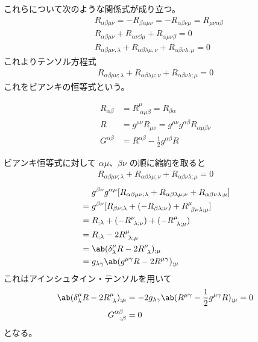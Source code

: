 \documentclass[uplatex,dvipdfmx,a4paper,11pt]{jlreq}
\theoremstyle{definition}
\begin{document}
これらについて次のような関係式が成り立つ。
\begin{align}
   & R_{\alpha\beta\mu\nu} = -R_{\beta\alpha\mu\nu} = -R_{\alpha\beta\nu\mu} = R_{\mu\nu\alpha\beta}   \\
   & R_{\alpha\beta\mu\nu} + R_{\alpha\nu\beta\mu} + R_{\alpha\mu\nu\beta} = 0                         \\
   & R_{\alpha\beta\mu\nu,\lambda} + R_{\alpha\beta\lambda\mu,\nu} + R_{\alpha\beta\nu\lambda,\mu} = 0
\end{align}
これよりテンソル方程式
\begin{align}
  R_{\alpha\beta\mu\nu;\lambda} + R_{\alpha\beta\lambda\mu;\nu} + R_{\alpha\beta\nu\lambda;\mu} = 0
\end{align}
これをビアンキの恒等式という。
\begin{definition}
  \begin{align}
    R_{\alpha\beta} & = R^\mu_{\ \alpha\mu\beta} = R_{\beta\alpha}                            \\
    R               & = g^{\mu\nu}R_{\mu\nu} = g^{\mu\nu}g^{\alpha\beta}R_{\alpha\mu\beta\nu} \\
    G^{\alpha\beta} & = R^{\alpha\beta} - \frac{1}{2}g^{\alpha\beta}R
  \end{align}
\end{definition}
ビアンキ恒等式に対して $\alpha\mu$、$\beta\nu$ の順に縮約を取ると
\begin{align}
  R_{\alpha\beta\mu\nu;\lambda} + R_{\alpha\beta\lambda\mu;\nu} + R_{\alpha\beta\nu\lambda;\mu} = 0
\end{align}
\begin{align}
   & \quad\ g^{\beta\nu}g^{\alpha\mu}[R_{\alpha\beta\mu\nu;\lambda} + R_{\alpha\beta\lambda\mu;\nu} + R_{\alpha\beta\nu\lambda;\mu}] \\
   & = g^{\beta\nu}[R_{\beta\nu;\lambda} + (- R_{\beta\lambda;\nu}) + R^\mu_{\ \beta\nu\lambda;\mu}]                                 \\
   & = R_{;\lambda} + (- R^\nu_{\ \lambda;\nu}) + (-R^\mu_{\ \lambda;\mu})                                                           \\
   & = R_{;\lambda} - 2R^\mu_{\ \lambda;\mu}                                                                                         \\
   & = \ab(\delta^\mu_\lambda R - 2R^\mu_{\ \lambda})_{;\mu}                                                                         \\
   & = g_{\lambda\gamma}\ab(g^{\mu\gamma}R - 2R^{\mu\gamma})_{;\mu}
\end{align}
これはアインシュタイン・テンソルを用いて
\begin{align}
  \ab(\delta^\mu_\lambda R - 2R^\mu_{\ \lambda})_{;\mu} & = -2g_{\lambda\gamma}\ab(R^{\mu\gamma} - \frac{1}{2}g^{\mu\gamma}R)_{;\mu} = 0 \\
  G^{\alpha\beta}_{\ \ ;\beta}                          & = 0
\end{align}
となる。
\end{document}
